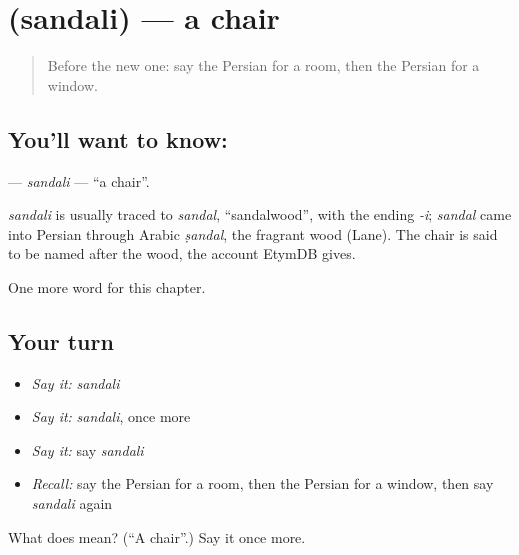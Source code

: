 \section[\texorpdfstring{\fa{صندلی} (sandali)}{صندلی (sandali)}]{ (sandali) — a chair}

\label{lesson:FA-C45-sandali}



\begin{quote}
Before the new one: say the Persian for a room, then the Persian for a window.
\end{quote}

\subsection*{You'll want to know: }
\textbf{} — \emph{sandali} — \textquotedblleft{}a chair\textquotedblright{}.

\begin{cousinweb}
\emph{sandali} is usually traced to \emph{sandal}, \textquotedblleft{}sandalwood\textquotedblright{}, with the ending \emph{-i}; \emph{sandal} came into Persian through Arabic \emph{ṣandal}, the fragrant wood (Lane). The chair is said to be named after the wood, the account EtymDB gives.
\end{cousinweb}

\begin{grammarlens}[title={What you've built}]
One more word for this chapter.
\end{grammarlens}

\subsection*{Your turn}
\begin{itemize}
\raggedright
  \item \emph{Say it:} \emph{sandali}
  \item \emph{Say it:} \emph{sandali}, once more
  \item \emph{Say it:} say \emph{sandali}
  \item \emph{Recall:} say the Persian for a room, then the Persian for a window, then say \emph{sandali} again
\end{itemize}

\begin{tcolorbox}[breakable,colback=teal!4,colframe=teal!35!black,title={Before you move on}]
What does  mean? (\textquotedblleft{}A chair\textquotedblright{}.) Say it once more.
\end{tcolorbox}
